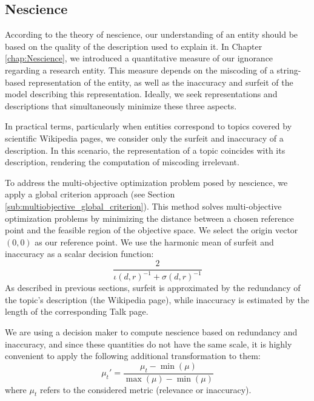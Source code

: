 \subsection{Nescience}

According to the theory of nescience, our understanding of an entity should be based on the quality of the description used to explain it. In Chapter \ref{chap:Nescience}, we introduced a quantitative measure of our ignorance regarding a research entity. This measure depends on the miscoding of a string-based representation of the entity, as well as the inaccuracy and surfeit of the model describing this representation. Ideally, we seek representations and descriptions that simultaneously minimize these three aspects.

In practical terms, particularly when entities correspond to topics covered by scientific Wikipedia pages, we consider only the surfeit and inaccuracy of a description. In this scenario, the representation of a topic coincides with its description, rendering the computation of miscoding irrelevant.

To address the multi-objective optimization problem posed by nescience, we apply a global criterion approach (see Section \ref{sub:multiobjective_global_criterion}). This method solves multi-objective optimization problems by minimizing the distance between a chosen reference point and the feasible region of the objective space. We select the origin vector $(0, 0)$ as our reference point. We use the harmonic mean of surfeit and inaccuracy as a scalar decision function:
\[
\frac{2}{ \iota(d, r)^{-1} + \sigma(d, r)^{-1} }
\]
As described in previous sections, surfeit is approximated by the redundancy of the topic's description (the Wikipedia page), while inaccuracy is estimated by the length of the corresponding Talk page.

We are using a decision maker to compute nescience based on redundancy and inaccuracy, and since these quantities do not have the same scale, it is highly convenient to apply the following additional transformation to them:
\[
\mu_{t}'=\frac{\mu_{t}-\min(\mu)}{\max(\mu)-\min(\mu)}
\]
where $\mu_t$ refers to the considered metric (relevance or inaccuracy). 

